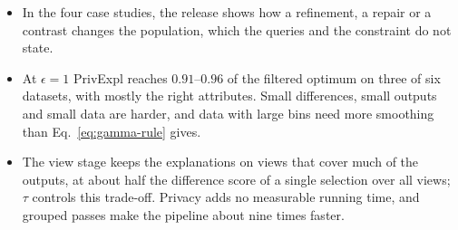 \begin{itemize}[leftmargin=*,itemsep=1pt,topsep=2pt]
  \item In the four case studies, the release shows how a refinement, a repair or a contrast changes the population, which the queries and the constraint do not state.
  \item At $\epsilon=1$ \textsf{PrivExpl} reaches $0.91$--$0.96$ of the filtered optimum on three of six datasets, with mostly the right attributes. Small differences, small outputs and small data are harder, and data with large bins need more smoothing than Eq.~\eqref{eq:gamma-rule} gives.
  \item The view stage keeps the explanations on views that cover much of the outputs, at about half the difference score of a single selection over all views; $\tau$ controls this trade-off. Privacy adds no measurable running time, and grouped passes make the pipeline about nine times faster.
\end{itemize}
